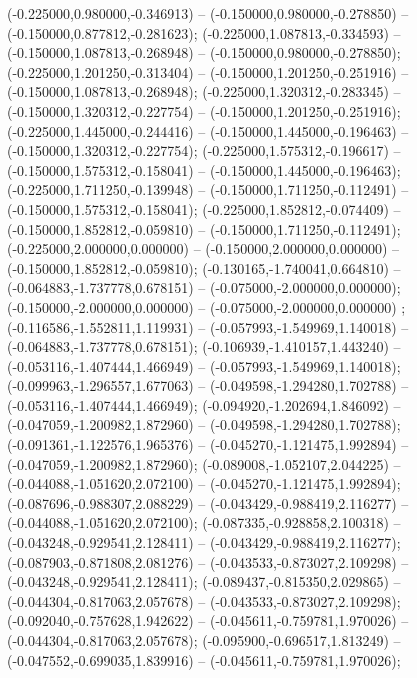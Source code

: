  (-0.225000,0.980000,-0.346913) -- (-0.150000,0.980000,-0.278850) -- (-0.150000,0.877812,-0.281623);
 (-0.225000,1.087813,-0.334593) -- (-0.150000,1.087813,-0.268948) -- (-0.150000,0.980000,-0.278850);
 (-0.225000,1.201250,-0.313404) -- (-0.150000,1.201250,-0.251916) -- (-0.150000,1.087813,-0.268948);
 (-0.225000,1.320312,-0.283345) -- (-0.150000,1.320312,-0.227754) -- (-0.150000,1.201250,-0.251916);
 (-0.225000,1.445000,-0.244416) -- (-0.150000,1.445000,-0.196463) -- (-0.150000,1.320312,-0.227754);
 (-0.225000,1.575312,-0.196617) -- (-0.150000,1.575312,-0.158041) -- (-0.150000,1.445000,-0.196463);
 (-0.225000,1.711250,-0.139948) -- (-0.150000,1.711250,-0.112491) -- (-0.150000,1.575312,-0.158041);
 (-0.225000,1.852812,-0.074409) -- (-0.150000,1.852812,-0.059810) -- (-0.150000,1.711250,-0.112491);
 (-0.225000,2.000000,0.000000) -- (-0.150000,2.000000,0.000000) -- (-0.150000,1.852812,-0.059810);
 (-0.130165,-1.740041,0.664810) -- (-0.064883,-1.737778,0.678151) -- (-0.075000,-2.000000,0.000000);
 (-0.150000,-2.000000,0.000000) -- (-0.075000,-2.000000,0.000000) ;
 (-0.116586,-1.552811,1.119931) -- (-0.057993,-1.549969,1.140018) -- (-0.064883,-1.737778,0.678151);
 (-0.106939,-1.410157,1.443240) -- (-0.053116,-1.407444,1.466949) -- (-0.057993,-1.549969,1.140018);
 (-0.099963,-1.296557,1.677063) -- (-0.049598,-1.294280,1.702788) -- (-0.053116,-1.407444,1.466949);
 (-0.094920,-1.202694,1.846092) -- (-0.047059,-1.200982,1.872960) -- (-0.049598,-1.294280,1.702788);
 (-0.091361,-1.122576,1.965376) -- (-0.045270,-1.121475,1.992894) -- (-0.047059,-1.200982,1.872960);
 (-0.089008,-1.052107,2.044225) -- (-0.044088,-1.051620,2.072100) -- (-0.045270,-1.121475,1.992894);
 (-0.087696,-0.988307,2.088229) -- (-0.043429,-0.988419,2.116277) -- (-0.044088,-1.051620,2.072100);
 (-0.087335,-0.928858,2.100318) -- (-0.043248,-0.929541,2.128411) -- (-0.043429,-0.988419,2.116277);
 (-0.087903,-0.871808,2.081276) -- (-0.043533,-0.873027,2.109298) -- (-0.043248,-0.929541,2.128411);
 (-0.089437,-0.815350,2.029865) -- (-0.044304,-0.817063,2.057678) -- (-0.043533,-0.873027,2.109298);
 (-0.092040,-0.757628,1.942622) -- (-0.045611,-0.759781,1.970026) -- (-0.044304,-0.817063,2.057678);
 (-0.095900,-0.696517,1.813249) -- (-0.047552,-0.699035,1.839916) -- (-0.045611,-0.759781,1.970026);
